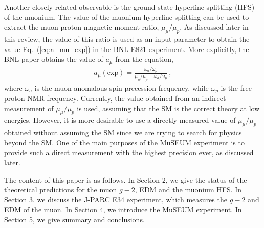 Another closely related observable is the ground-state hyperfine
splitting (HFS) of the muonium.  The value of the muonium hyperfine
splitting can be used to extract the muon-proton magnetic
moment ratio, $\mu_\mu/\mu_p$.  As discussed later in this review,
the value of this ratio is used as an input parameter to obtain
the value Eq.~(\ref{eq:a_mu_exp}) in the BNL E821 experiment.  
More explicitly, the BNL paper obtains the value of $a_\mu$
from the equation,
%
\begin{align}
 a_\mu(\text{exp}) =
  \frac{\omega_a/\omega_p}{\mu_\mu/\mu_p - \omega_a/\omega_p} ~, 
\end{align}
%
where $\omega_a$ is the muon anomalous spin precession frequency,
while $\omega_p$ is the free proton NMR frequency.
Currently, the value obtained from an indirect measurement of 
$\mu_\mu/\mu_p$ is used, assuming that the SM is the correct
theory at low energies.  However, it is more desirable to use
a directly measured value of $\mu_\mu/\mu_p$ obtained without
assuming the SM since we are trying to search for physics
beyond the SM.  One of the main
purposes of the MuSEUM experiment is to provide such a direct
measurement with the highest precision ever, as discussed later.  

The content of this paper is as follows.  In Section 2, we
give the status of the theoretical predictions for the muon $g-2$,
EDM and the muonium HFS.  In Section 3, we discuss the J-PARC
E34 experiment, which measures the $g-2$ and EDM of the muon.
In Section 4, we introduce the MuSEUM experiment.  In Section 5,
we give summary and conclusions.





